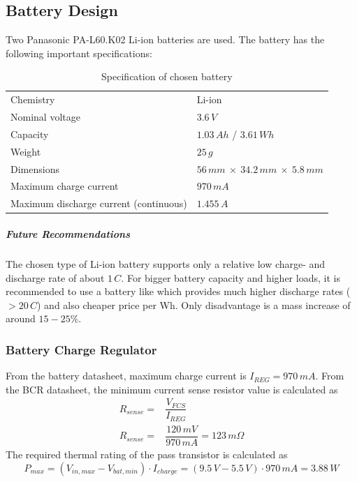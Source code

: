 \subsection{Battery Design}
%
Two Panasonic PA-L60.K02 \cite{panasonic} Li-ion batteries are used. The battery has the following important specifications:
%
\begin{table}[H]
\centering
\caption{Specification of chosen battery}
\label{tab:proposed_battery}
\begin{tabular}{ll}
\hline
Chemistry & Li-ion\\
Nominal voltage & $3.6\,V$\\
Capacity & $1.03\,Ah$ / $3.61\,Wh$\\
Weight & $25\,g$\\
Dimensions & $56\,mm\:\times\:34.2\,mm\:\times\:5.8\,mm$\\
Maximum charge current & $970\,mA$\\
Maximum discharge current (continuous) & $1.455\,A$\\
\hline
\end{tabular}
\end{table}
%
%
\subparagraph*{Future Recommendations}
%
The chosen type of Li-ion battery supports only a relative low charge- and discharge rate of about $1\,C$. For bigger battery capacity and higher loads, it is recommended to use a battery like \cite{rcflight_battery} which provides much higher discharge rates ($>20\,C$) and also cheaper price per Wh. Only disadvantage  is a mass increase of around $15-25\%$.
%
\subsubsection{Battery Charge Regulator}
%
From the battery datasheet, maximum charge current is $I_{REG}=970\,mA$. From the \ac{BCR} datasheet, the minimum current sense resistor value is calculated as
%
\begin{equation}
\begin{split}
R_{sense}=&\dfrac{V_{FCS}}{I_{REG}}\\
R_{sense}=&\dfrac{120\,mV}{970\,mA}=123\,m\Omega
\end{split}
\end{equation}
%
The required thermal rating of the pass transistor is calculated as
%
\begin{equation}
P_{max}=(V_{in,max}-V_{bat,min})\cdot I_{charge}=(9.5\,V-5.5\,V)\cdot 970\,mA=3.88\,W
\end{equation}
%
